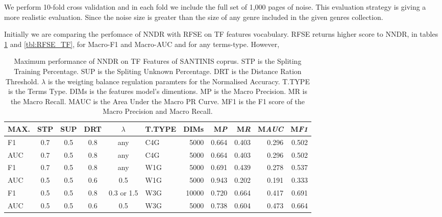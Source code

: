 \documentclass[runningheads]{llncs}
\begin{document}
We perform  10-fold cross validation and in each fold we include the full set of 1,000 pages of noise. This evaluation strategy is giving a more realistic evaluation. Since the noise size is greater than the size of any genre included in the given genres collection.

Initially we are comparing the perfomace of NNDR with RFSE on TF features vocabulary. RFSE returns higher score to NNDR, in tables \ref{tbl:NNDR_TF} and \ref{tbl:RFSE_TF}, for Macro-F1 and Macro-AUC and for any terms-type. However,

\pagebreak

\begin{table}
\center
\begin{tabular}{|l|cccc|lr|rrrr|}
\hline
MAX. & STP & SUP & DRT & $\lambda$ & T.TYPE & DIMs & M\emph{P} & M\emph{R} & M\emph{AUC} & M\emph{F1} \\
\hline
F1 & 0.7 & 0.5 & 0.8 & any & C4G & 5000 & 0.664 & 0.403 & 0.296 & 0.502 \\
AUC & 0.7 & 0.5 & 0.8 & any & C4G & 5000 & 0.664 & 0.403 & 0.296 & 0.502 \\
F1 & 0.7 & 0.5 & 0.8 & any & W1G & 5000 & 0.691 & 0.439 & 0.278 & 0.537 \\
AUC & 0.5 & 0.5 & 0.6 & 0.5 & W1G & 5000 & 0.943 & 0.202 & 0.191 & 0.333 \\
F1 & 0.5 & 0.5 & 0.8 & 0.3 or 1.5 & W3G & 10000 & 0.720 & 0.664 & 0.417 & 0.691 \\
AUC & 0.5 & 0.5 & 0.6 & 0.5 & W3G & 5000 & 0.738 & 0.604 & 0.473 & 0.664 \\
\hline
\end{tabular}
\caption {Maximum performance of NNDR on TF Features of SANTINIS coprus. STP is the Spliting Training Percentage. SUP is the Spliting Unknown Percentage. DRT is the Distance Ration Threshold. $\lambda$ is the weigting balance regulation paramters for the Normalised Accuracy. T.TYPE is the Terms Type. DIMs is the features model's dimentions. MP is the Macro Precision. MR is the Macro Recall. MAUC is the Area Under the Macro PR Curve. MF1 is the F1 score of the Macro Precision and Macro Recall.}
\label{tbl:NNDR_TF}
\vspace{-15mm}
\end{table}
\end{document}
